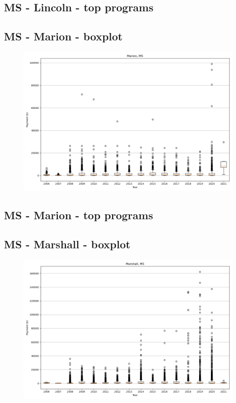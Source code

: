 \subsection*{MS - Lincoln - top programs}

\newpage
\subsection*{MS - Marion - boxplot}
\begin{figure}[h]
\centering
\includegraphics[width=7in]{../output/boxplots/counties/Marion-MS_boxplot.png}
\end{figure}


\subsection*{MS - Marion - top programs}

\newpage
\subsection*{MS - Marshall - boxplot}
\begin{figure}[h]
\centering
\includegraphics[width=7in]{../output/boxplots/counties/Marshall-MS_boxplot.png}
\end{figure}


